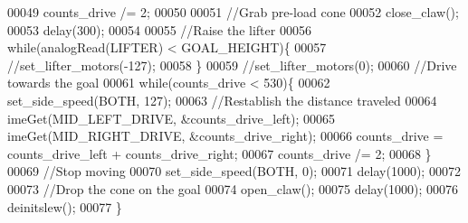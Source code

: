 \begin{DoxyCode}
00049   counts\_drive /= 2;
00050 
00051   \textcolor{comment}{//Grab pre-load cone}
00052   close_claw();
00053   delay(300);
00054 
00055   \textcolor{comment}{//Raise the lifter}
00056   \textcolor{keywordflow}{while}(analogRead(LIFTER) < GOAL_HEIGHT)\{
00057     \textcolor{comment}{//set\_lifter\_motors(-127);}
00058   \}
00059   \textcolor{comment}{//set\_lifter\_motors(0);}
00060   \textcolor{comment}{//Drive towards the goal}
00061   \textcolor{keywordflow}{while}(counts\_drive < 530)\{
00062     set_side_speed(BOTH, 127);
00063     \textcolor{comment}{//Restablish the distance traveled}
00064     imeGet(MID_LEFT_DRIVE, &counts\_drive\_left);
00065     imeGet(MID_RIGHT_DRIVE, &counts\_drive\_right);
00066     counts\_drive = counts\_drive\_left + counts\_drive\_right;
00067     counts\_drive /= 2;
00068   \}
00069   \textcolor{comment}{//Stop moving}
00070   set_side_speed(BOTH, 0);
00071   delay(1000);
00072 
00073   \textcolor{comment}{//Drop the cone on the goal}
00074   open_claw();
00075   delay(1000);
00076   deinitslew();
00077 \}
\end{DoxyCode}
